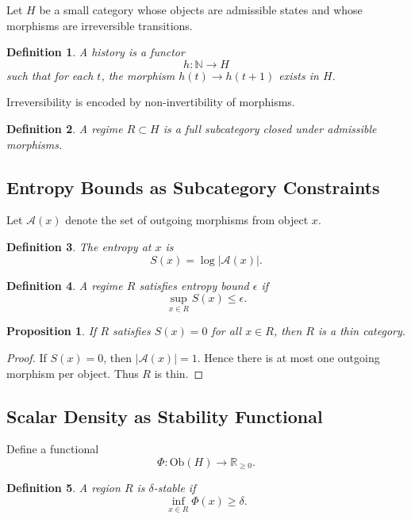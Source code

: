 \documentclass[12pt]{article}
\newtheorem{proposition}{Proposition}
\newtheorem{definition}{Definition}
\begin{document}
Let $H$ be a small category whose objects are admissible states and whose morphisms are irreversible transitions.

\begin{definition}
A history is a functor
\[
h : \mathbb{N} \to H
\]
such that for each $t$, the morphism $h(t) \to h(t+1)$ exists in $H$.
\end{definition}

Irreversibility is encoded by non-invertibility of morphisms.

\begin{definition}
A regime $R \subset H$ is a full subcategory closed under admissible morphisms.
\end{definition}

\subsection{Entropy Bounds as Subcategory Constraints}

Let $\mathcal{A}(x)$ denote the set of outgoing morphisms from object $x$.

\begin{definition}
The entropy at $x$ is
\[
S(x) = \log |\mathcal{A}(x)|.
\]
\end{definition}

\begin{definition}
A regime $R$ satisfies entropy bound $\epsilon$ if
\[
\sup_{x \in R} S(x) \leq \epsilon.
\]
\end{definition}

\begin{proposition}
If $R$ satisfies $S(x)=0$ for all $x \in R$, then $R$ is a thin category.
\end{proposition}

\begin{proof}
If $S(x)=0$, then $|\mathcal{A}(x)|=1$. Hence there is at most one outgoing morphism per object. Thus $R$ is thin.
\end{proof}

\subsection{Scalar Density as Stability Functional}

Define a functional
\[
\Phi : \mathrm{Ob}(H) \to \mathbb{R}_{\ge 0}.
\]

\begin{definition}
A region $R$ is $\delta$-stable if
\[
\inf_{x \in R} \Phi(x) \ge \delta.
\]
\end{definition}
\end{document}
